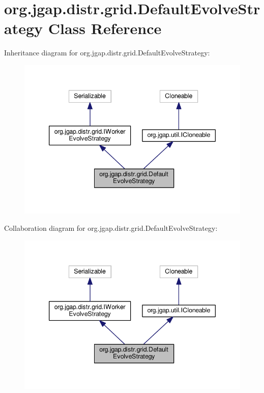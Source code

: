 \hypertarget{classorg_1_1jgap_1_1distr_1_1grid_1_1_default_evolve_strategy}{\section{org.\-jgap.\-distr.\-grid.\-Default\-Evolve\-Strategy Class Reference}
\label{classorg_1_1jgap_1_1distr_1_1grid_1_1_default_evolve_strategy}
}


Inheritance diagram for org.\-jgap.\-distr.\-grid.\-Default\-Evolve\-Strategy\-:
\nopagebreak
\begin{figure}[H]
\begin{center}
\leavevmode
\includegraphics[width=342pt]{classorg_1_1jgap_1_1distr_1_1grid_1_1_default_evolve_strategy__inherit__graph}
\end{center}
\end{figure}


Collaboration diagram for org.\-jgap.\-distr.\-grid.\-Default\-Evolve\-Strategy\-:
\nopagebreak
\begin{figure}[H]
\begin{center}
\leavevmode
\includegraphics[width=342pt]{classorg_1_1jgap_1_1distr_1_1grid_1_1_default_evolve_strategy__coll__graph}
\end{center}
\end{figure}
